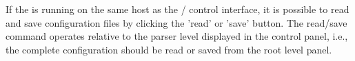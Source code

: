 If the \mha{} is running on the same host as the \Octave{}/\Matlab{} control
interface, it is possible to read and save \mha{} configuration files by
clicking the 'read' or 'save' button. The read/save command operates
relative to the \mha{} parser level displayed in the control panel, i.e.,
the complete configuration should be read or saved from the root level
panel.


